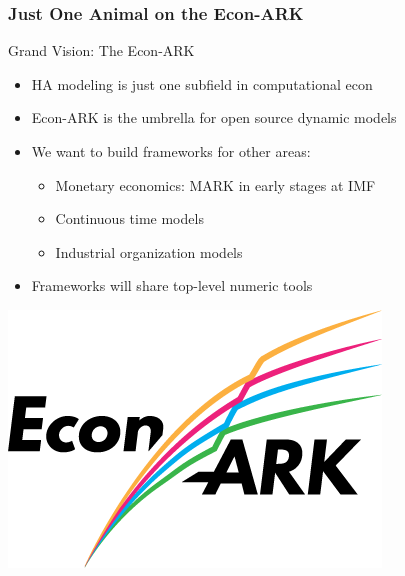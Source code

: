 \documentclass{beamer}
\newcommand{\bi}{\begin{itemize}}
\newcommand{\ei}{\end{itemize}}
\begin{document}
\begin{frame}
\frametitle{Just One Animal on the Econ-ARK}

\begin{block}{Grand Vision: The Econ-ARK}
\bi

\item HA modeling is just one subfield in computational econ

\item Econ-ARK is the umbrella for open source dynamic models

\item We want to build frameworks for other areas:
   \bi
   \item Monetary economics: MARK in early stages at IMF 

   \item Continuous time models

   \item Industrial organization models
   \ei

\item Frameworks will share top-level numeric tools

\ei
\end{block}

\begin{center}
\includegraphics[scale=0.35]{EconArkLogo.png}
\end{center}


\end{frame}
\end{document}
